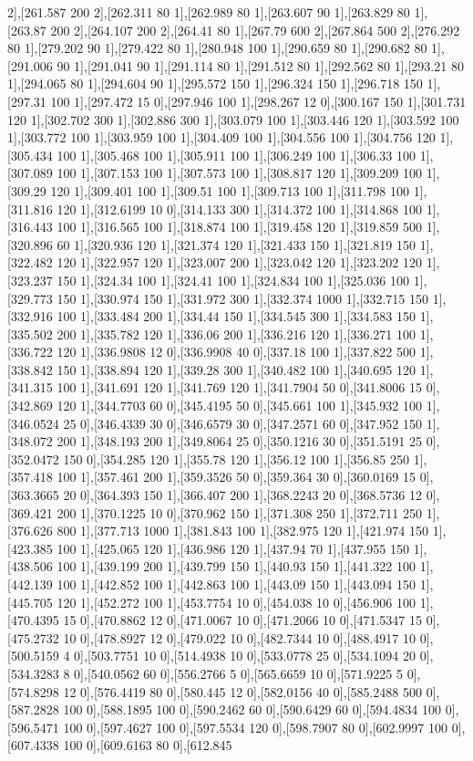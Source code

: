 {2],[261.587 200 2],[262.311 80 1],[262.989 80 1],[263.607 90 1],[263.829 80 1],[263.87 200 2],[264.107 200 2],[264.41 80 1],[267.79 600 2],[267.864 500 2],[276.292 80 1],[279.202 90 1],[279.422 80 1],[280.948 100 1],[290.659 80 1],[290.682 80 1],[291.006 90 1],[291.041 90 1],[291.114 80 1],[291.512 80 1],[292.562 80 1],[293.21 80 1],[294.065 80 1],[294.604 90 1],[295.572 150 1],[296.324 150 1],[296.718 150 1],[297.31 100 1],[297.472 15 0],[297.946 100 1],[298.267 12 0],[300.167 150 1],[301.731 120 1],[302.702 300 1],[302.886 300 1],[303.079 100 1],[303.446 120 1],[303.592 100 1],[303.772 100 1],[303.959 100 1],[304.409 100 1],[304.556 100 1],[304.756 120 1],[305.434 100 1],[305.468 100 1],[305.911 100 1],[306.249 100 1],[306.33 100 1],[307.089 100 1],[307.153 100 1],[307.573 100 1],[308.817 120 1],[309.209 100 1],[309.29 120 1],[309.401 100 1],[309.51 100 1],[309.713 100 1],[311.798 100 1],[311.816 120 1],[312.6199 10 0],[314.133 300 1],[314.372 100 1],[314.868 100 1],[316.443 100 1],[316.565 100 1],[318.874 100 1],[319.458 120 1],[319.859 500 1],[320.896 60 1],[320.936 120 1],[321.374 120 1],[321.433 150 1],[321.819 150 1],[322.482 120 1],[322.957 120 1],[323.007 200 1],[323.042 120 1],[323.202 120 1],[323.237 150 1],[324.34 100 1],[324.41 100 1],[324.834 100 1],[325.036 100 1],[329.773 150 1],[330.974 150 1],[331.972 300 1],[332.374 1000 1],[332.715 150 1],[332.916 100 1],[333.484 200 1],[334.44 150 1],[334.545 300 1],[334.583 150 1],[335.502 200 1],[335.782 120 1],[336.06 200 1],[336.216 120 1],[336.271 100 1],[336.722 120 1],[336.9808 12 0],[336.9908 40 0],[337.18 100 1],[337.822 500 1],[338.842 150 1],[338.894 120 1],[339.28 300 1],[340.482 100 1],[340.695 120 1],[341.315 100 1],[341.691 120 1],[341.769 120 1],[341.7904 50 0],[341.8006 15 0],[342.869 120 1],[344.7703 60 0],[345.4195 50 0],[345.661 100 1],[345.932 100 1],[346.0524 25 0],[346.4339 30 0],[346.6579 30 0],[347.2571 60 0],[347.952 150 1],[348.072 200 1],[348.193 200 1],[349.8064 25 0],[350.1216 30 0],[351.5191 25 0],[352.0472 150 0],[354.285 120 1],[355.78 120 1],[356.12 100 1],[356.85 250 1],[357.418 100 1],[357.461 200 1],[359.3526 50 0],[359.364 30 0],[360.0169 15 0],[363.3665 20 0],[364.393 150 1],[366.407 200 1],[368.2243 20 0],[368.5736 12 0],[369.421 200 1],[370.1225 10 0],[370.962 150 1],[371.308 250 1],[372.711 250 1],[376.626 800 1],[377.713 1000 1],[381.843 100 1],[382.975 120 1],[421.974 150 1],[423.385 100 1],[425.065 120 1],[436.986 120 1],[437.94 70 1],[437.955 150 1],[438.506 100 1],[439.199 200 1],[439.799 150 1],[440.93 150 1],[441.322 100 1],[442.139 100 1],[442.852 100 1],[442.863 100 1],[443.09 150 1],[443.094 150 1],[445.705 120 1],[452.272 100 1],[453.7754 10 0],[454.038 10 0],[456.906 100 1],[470.4395 15 0],[470.8862 12 0],[471.0067 10 0],[471.2066 10 0],[471.5347 15 0],[475.2732 10 0],[478.8927 12 0],[479.022 10 0],[482.7344 10 0],[488.4917 10 0],[500.5159 4 0],[503.7751 10 0],[514.4938 10 0],[533.0778 25 0],[534.1094 20 0],[534.3283 8 0],[540.0562 60 0],[556.2766 5 0],[565.6659 10 0],[571.9225 5 0],[574.8298 12 0],[576.4419 80 0],[580.445 12 0],[582.0156 40 0],[585.2488 500 0],[587.2828 100 0],[588.1895 100 0],[590.2462 60 0],[590.6429 60 0],[594.4834 100 0],[596.5471 100 0],[597.4627 100 0],[597.5534 120 0],[598.7907 80 0],[602.9997 100 0],[607.4338 100 0],[609.6163 80 0],[612.845 }

